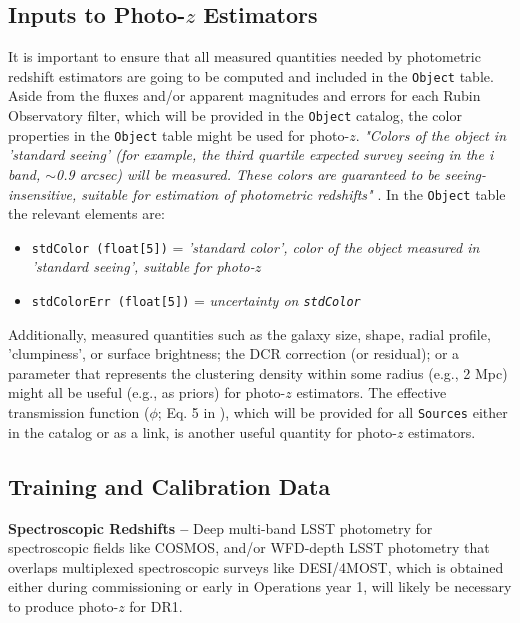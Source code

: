 \documentclass[DM,lsstdraft,toc]{lsstdoc}
\begin{document}
\subsection{Inputs to Photo-$z$ Estimators}\label{ssec:dp_objvals}

It is important to ensure that all measured quantities needed by photometric redshift estimators are going to be computed and included in the {\tt Object} table. 
Aside from the fluxes and/or apparent magnitudes and errors for each Rubin Observatory filter, which will be provided in the {\tt Object} catalog, the color properties in the {\tt Object} table might be used for photo-$z$. {\it "Colors of the object in 'standard seeing' (for example, the third quartile expected survey seeing in the i band, $\sim$0.9 arcsec) will be measured. These colors are guaranteed to be seeing-insensitive, suitable for estimation of photometric redshifts"} . In the {\tt Object} table the relevant elements are:
\vspace{-15pt}
\begin{itemize}
\item \texttt{stdColor (float[5])} = {\it 'standard color', color of the object measured in 'standard seeing', suitable for photo-$z$}
\item \texttt{stdColorErr (float[5])} = {\it uncertainty on \texttt{stdColor}}
\end{itemize}

Additionally, measured quantities such as the galaxy size, shape, radial profile, 'clumpiness', or surface brightness; the DCR correction (or residual); or a parameter that represents the clustering density within some radius (e.g., 2 Mpc) might all be useful (e.g., as priors) for photo-$z$ estimators. The effective transmission function ($\phi$; Eq. 5 in ), which will be provided for all {\tt Sources} either in the catalog or as a link, is another useful quantity for photo-$z$ estimators.

\subsection{Training and Calibration Data}\label{ssec:dp_calib}

{\bf Spectroscopic Redshifts --}
Deep multi-band LSST photometry for spectroscopic fields like COSMOS, and/or WFD-depth LSST photometry that overlaps multiplexed spectroscopic surveys like DESI/4MOST, which is obtained either during commissioning or early in Operations year 1, will likely be necessary to produce photo-$z$ for DR1.
\end{document}
